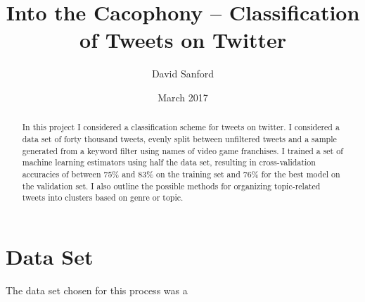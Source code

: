 \documentclass[11pt]{revtex4-1}
\newcommand{\PRE}[1]{{#1}}
\begin{document}
\title{ \PRE{\vspace*{1.5in}} Into the Cacophony -- Classification of
  Tweets on Twitter \PRE{\vspace*{0.3in}}}

\author{David Sanford}

\date{March 2017}

\begin{abstract}
\PRE{\vspace*{.3in}} In this project I considered a classification
scheme for tweets on twitter.  I considered a data set of forty
thousand tweets, evenly split between unfiltered tweets and a sample
generated from a keyword filter using names of video game franchises.
I trained a set of machine learning estimators using half the data
set, resulting in cross-validation accuracies of between 75\% and 83\%
on the training set and 76\% for the best model on the validation set.
I also outline the possible methods for organizing topic-related
tweets into clusters based on genre or topic.
\end{abstract}

\maketitle

\section{Data Set}
\label{sec:data}



The data set chosen for this process was a 
\end{document}

